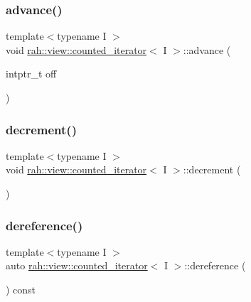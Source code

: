\subsubsection{\texorpdfstring{advance()}{advance()}}
{\footnotesize\ttfamily template$<$typename I $>$ \\
void \mbox{\hyperlink{structrah_1_1view_1_1counted__iterator}{rah\+::view\+::counted\+\_\+iterator}}$<$ I $>$\+::advance (\begin{DoxyParamCaption}\item[{intptr\+\_\+t}]{off }\end{DoxyParamCaption})\hspace{0.3cm}{\ttfamily [inline]}}

\mbox{\label{structrah_1_1view_1_1counted__iterator_abeb34df8feb243fce3eec27d45b19aa2}} 
\subsubsection{\texorpdfstring{decrement()}{decrement()}}
{\footnotesize\ttfamily template$<$typename I $>$ \\
void \mbox{\hyperlink{structrah_1_1view_1_1counted__iterator}{rah\+::view\+::counted\+\_\+iterator}}$<$ I $>$\+::decrement (\begin{DoxyParamCaption}{ }\end{DoxyParamCaption})\hspace{0.3cm}{\ttfamily [inline]}}

\mbox{\label{structrah_1_1view_1_1counted__iterator_a35446b4aba49b230600a841c3269fbc3}} 
\subsubsection{\texorpdfstring{dereference()}{dereference()}}
{\footnotesize\ttfamily template$<$typename I $>$ \\
auto \mbox{\hyperlink{structrah_1_1view_1_1counted__iterator}{rah\+::view\+::counted\+\_\+iterator}}$<$ I $>$\+::dereference (\begin{DoxyParamCaption}{ }\end{DoxyParamCaption}) const\hspace{0.3cm}{\ttfamily [inline]}}

